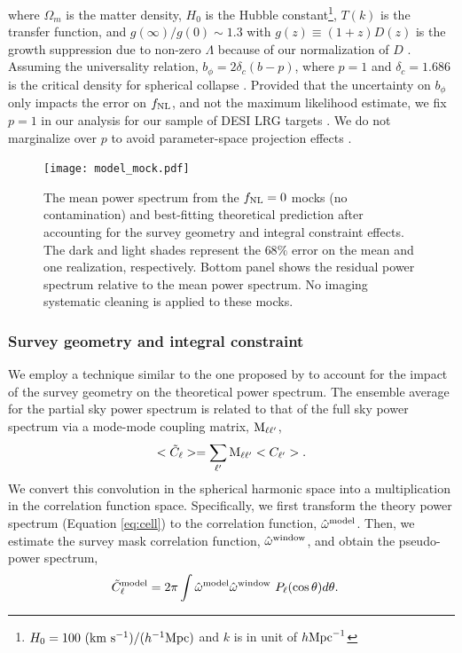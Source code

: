 where $\Omega_{m}$ is the matter density, $H_{0}$ is the Hubble constant\footnote{$H_{0}=100~({\rm km}~{\rm s}^{-1})/(h^{-1}{\rm Mpc})$ and $k$ is in unit of $h {\rm Mpc}^{-1}$}, $T(k)$ is the transfer function, and $g(\infty)/g(0) \sim 1.3$ with $g(z)\equiv (1+z) D(z)$ is the growth suppression due to non-zero $\Lambda$ because of our normalization of $D$ \citep[see, e.g.,][]{2010JCAP...07..013R, 2019MNRAS.485.4160M}. Assuming the universality relation, $b_{\phi} = 2 \delta_{c}(b - p)$, where $p=1$ and $\delta_{c}= 1.686$ is the critical density for spherical collapse \citep{fillmore1984self}. Provided that the uncertainty on $b_{\phi}$ only impacts the error on $f_{\rm NL}$, and not the maximum likelihood estimate, we fix $p=1$ in our analysis for our sample of DESI LRG targets \citep[see, also,][]{slosar2008constraints,2010JCAP...07..013R,2013MNRAS.428.1116R}. We do not marginalize over $p$ to avoid parameter-space projection effects \citep{2022JCAP...11..013B}.

\begin{figure}
\centering
\texttt{[image: model\_mock.pdf]}
\caption{The mean power spectrum from the $f_{\rm NL}=0$ mocks (no contamination) and best-fitting theoretical prediction after accounting for the survey geometry and integral constraint effects. The dark and light shades represent the $68\%$ error on the mean and one realization, respectively. Bottom panel shows the residual power spectrum relative to the mean power spectrum. No imaging systematic cleaning is applied to these mocks.}\label{fig:model_mock}
\end{figure}



\subsubsection{Survey geometry and integral constraint}
We employ a technique similar to the one proposed by \cite{chon2004fast} to account for the impact of the survey geometry on the theoretical power spectrum. The ensemble average for the partial sky power spectrum is related to that of the full sky power spectrum via a mode-mode coupling matrix, ${\rm M}_{\ell \ell^{\prime}}$,
\begin{equation}\label{eq:mixm}
    <\tilde{C}_{\ell}> = \sum_{\ell^{\prime}} {\rm M}_{\ell \ell^{\prime}}<C_{\ell^{\prime}}>.
\end{equation}
We convert this convolution in the spherical harmonic space into a multiplication in the correlation function space. Specifically, we first transform the theory power spectrum (Equation \ref{eq:cell}) to the correlation function, $\hat{\omega}^{\rm model}$. Then, we estimate the survey mask correlation function, $\hat{\omega}^{\rm window}$, and obtain the pseudo-power spectrum,
\begin{align}
    \tilde{C}^{\rm model}_{\ell} &= 2\pi \int \hat{\omega}^{\rm model}\hat{\omega}^{\rm window}~P_{\ell}(\cos \theta) d\theta.
\end{align}

